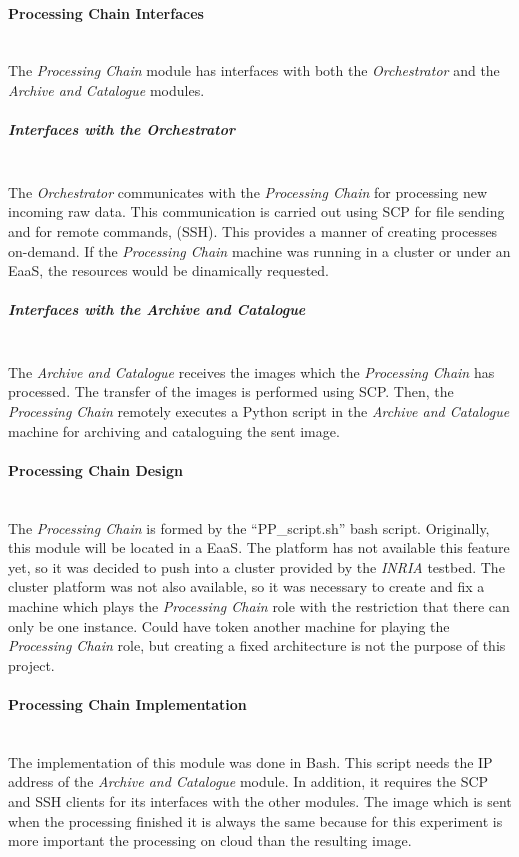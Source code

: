 \paragraph{Processing Chain Interfaces}~\\

The \emph{Processing Chain} module has interfaces with both the \emph{Orchestrator}
and the \emph{Archive and Catalogue} modules.
\subparagraph{Interfaces with the Orchestrator}~\\

The \emph{Orchestrator} communicates with the \emph{Processing Chain} for
processing new incoming raw data. This communication is carried out using \ac{SCP} for file sending and for remote commands, (\ac{SSH}). This provides a manner of creating processes
on-demand. If the \emph{Processing Chain} machine was running in a cluster or
under an \ac{EaaS}, the
resources would be dinamically requested. 

\subparagraph{Interfaces with the Archive and Catalogue}~\\

The \emph{Archive and Catalogue} receives the images which the \emph{Processing
  Chain} has processed. The transfer of the images is performed using \ac{SCP}. Then, the
\emph{Processing Chain} remotely executes a Python script in the \emph{Archive
  and Catalogue} machine for archiving and
cataloguing the sent image.

\paragraph{Processing Chain Design}~\\

The \emph{Processing Chain} is formed by the ``PP\_script.sh'' bash
script. Originally, this module will be located in a \acl{EaaS}. The \bonfire
platform has not available this feature yet, so it was decided to push into a
cluster provided by the \emph{INRIA} testbed. The cluster platform was not also
available, so it was necessary to create and fix a machine which plays the
\emph{Processing Chain} role with the restriction that there can only be one
instance. Could have token another machine for playing the \emph{Processing
  Chain} role, but creating a fixed architecture is not the purpose of this
project.

\paragraph{Processing Chain Implementation}~\\
\label{par:pp-impl}
The implementation of this module was done in Bash. This script needs the
\ac{IP} address of the \emph{Archive and Catalogue} module. In addition, it
requires the \ac{SCP} and \ac{SSH} clients for its interfaces with the other
modules. The image which is sent when the processing finished it is always the
same because for this experiment is more important the processing on cloud than
the resulting image.
  
